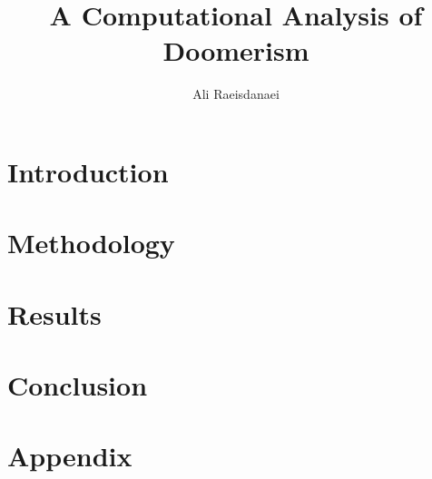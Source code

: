 \documentclass{article}
\begin{document}

\title{A Computational Analysis of Doomerism}
\author{Ali Raeisdanaei}
\maketitle

\begin{multicols}{2}
\section{Introduction}


% 

\section{Methodology}


\section{Results}


\section{Conclusion}


\end{multicols}

\printbibliography

\section{Appendix} \label{appendix}

\end{document}
